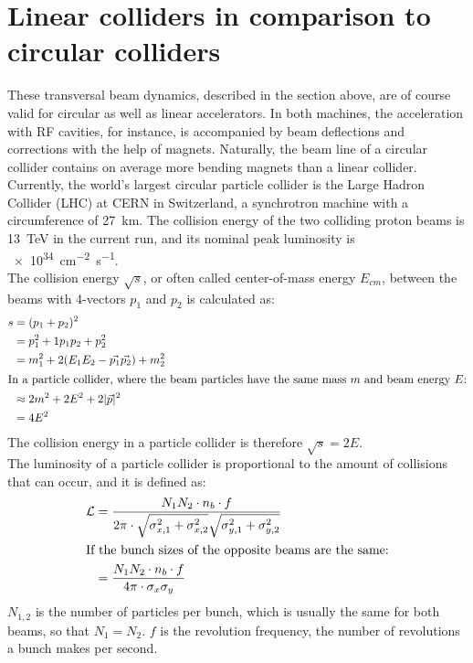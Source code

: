 \section{Linear colliders in comparison to circular colliders}
\label{AccPhysics:Linear-Circular}
These transversal beam dynamics, described in the section above, are of course valid for circular as well as linear accelerators.
In both machines, the acceleration with RF cavities, for instance, is accompanied by beam deflections and corrections with the help of magnets.
Naturally, the beam line of a circular collider contains on average more bending magnets than a linear collider.\\
Currently, the world's largest circular particle collider is the Large Hadron Collider (LHC) at CERN in Switzerland, a synchrotron machine with a circumference of \SI{27}{\kilo\meter}.
The collision energy of the two colliding proton beams is \SI{13}{\TeV} in the current run, and its nominal peak luminosity \lumi is \SI{e34}{\centi\meter^{-2}\second^{-1}}.~\cite[p. 3]{LHC_Paper}\\
The collision energy $\sqrt{s}$, or often called center-of-mass energy $E_{cm}$, between the beams with 4-vectors $p_1$ and $p_2$ is calculated as:
\begin{align*}
 s &= (p_1+p_2)^2\\
 &=p_1^2+1p_1p_2+p_2^2\\
 &=m_1^2+2(E_1E_2-\vec{p_1}\vec{p_2})+m_2^2\\
\intertext{In a particle collider, where the beam particles have the same mass $m$ and beam energy $E$:}
&\approx2m^2+2E^2+2|\vec{p}|^2\\
&=4E^2
\end{align*}
The collision energy in a particle collider is therefore $\sqrt{s}=2E$.\\
The luminosity of a particle collider is proportional to the amount of collisions that can occur, and it is defined as:
\begin{align}
 \mathcal{L}&=\frac{N_1N_2 \cdot n_b \cdot f}{2\pi \cdot \sqrt{\sigma^2_{x,1}+\sigma^2_{x,2}} \sqrt{\sigma^2_{y,1}+\sigma^2_{y,2}}}\\
 \intertext{If the bunch sizes of the opposite beams are the same:}
 &=\frac{N_1N_2 \cdot n_b \cdot f}{4\pi \cdot \sigma_x \sigma_y}
 \label{eq:luminosity}
\end{align}
$N_{1,2}$ is the number of particles per bunch, which is usually the same for both beams, so that $N_1=N_2$.
$f$ is the revolution frequency, the number of revolutions a bunch makes per second.
